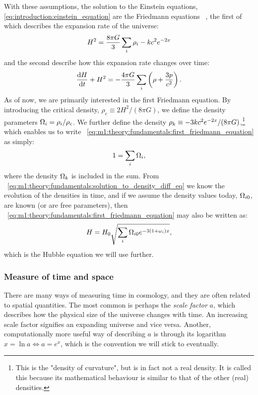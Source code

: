     With these assumptions, the solution to the Einstein equations, \cref{eq:introduction:einstein_equation} are the Friedmann equations ~\cite[ch. 8.3]{carroll_2019}, the first of which describes the expansion rate of the universe:
    \begin{equation}
        \label{eq:m1:theory:fundamentals:first_friedmann_equation}
        H^2 = \frac{8\pi G}{3}\sum_i\rho_i - kc^2e^{-2x} \\
    \end{equation}
    and the second describe how this expansion rate changes over time:
    \begin{equation}
        \label{eq:m1:theory:fundamentals:second_friedmann_equation}
        \dv{H}{t}+H^2 = -\frac{4\pi G}{3}\sum_i\left(\rho+\frac{3p}{c^2}\right).
    \end{equation}
    As of now, we are primarily interested in the first Friedmann equation. By introducing the critical density, $\rho_c\equiv2H^2/(8\pi G)$, we define the density parameters $\Omega_i=\rho_i/\rho_c$. We further define the density $\rho_k\equiv-3kc^2e^{-2x}/(8\pi G)$,\footnote{This is the "density of curvature", but is in fact not a real density. It is called this because its mathematical behaviour is similar to that of the other (real) densities.} which enables us to write ~\cref{eq:m1:theory:fundamentals:first_friedmann_equation} as simply:
    \begin{equation}
        1=\sum_i\Omega_i,
    \end{equation}
    where the density $\Omega_k$ is included in the sum. From ~\cref{eq:m1:theory:fundamentals:solution_to_density_diff_eq} we know the evolution of the densities in time, and if we assume the density values today, $\Omega_{i0}$, are known (or are free parameters), then ~\cref{eq:m1:theory:fundamentals:first_friedmann_equation} may also be written as:
    \begin{equation}\label{eq:m1:theory:fundamentals:Hubble_equation}
        H = H_0\sqrt{\sum_i\Omega_{i0}e^{-3(1+\omega_i)x}},
    \end{equation}
    which is the Hubble equation we will use further.


\subsubsection{Measure of time and space}\label{sec:m1:measure_time_space}
    There are many ways of measuring time in cosmology, and they are often related to spatial quantities. The most common is perhaps the \textit{scale factor} $a$, which describes how the physical size of the universe changes with time. An increasing scale factor signifies an expanding universe and vice versa. Another, computationally more useful way of describing $a$ is through its logarithm $x=\ln a \iff a=e^x$, which is the convention we will stick to eventually.
    
